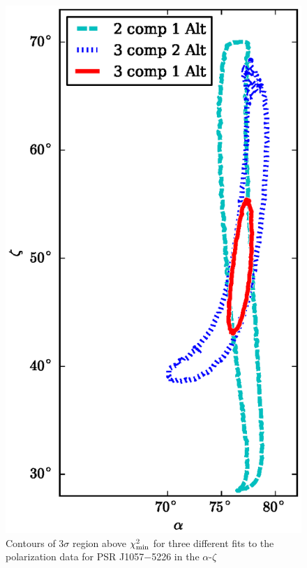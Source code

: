 \begin{figure}[htbp]
\begin{center}
\includegraphics[scale=1]{chapters/inwardDirectedPhotons/figures/J1057-5226Map323.eps}
\caption[Map of (unreduced) $\chi^2$ in the $\alpha$-$\zeta$ plane
for a three-altitude fit to the polarization data of PSR J1057$-$5226]{\label{fig:c2}
Contours of $3\sigma$ region above $\chi^2_{\rm{min}}$ for three different fits
to the polarization data for PSR J1057$-$5226 in the $\alpha$-$\zeta$
}
\end{center}
\end{figure}
